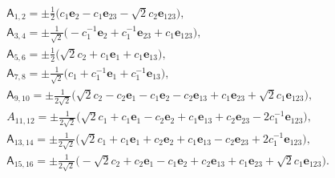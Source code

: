 \documentclass{birkjour}
\newcommand{\e}[1]{\mathbf{e}_{#1}} %
\def\A{\mathsf{A}}
\def\e#1{\mathbf{e}_{#1}} %
\begin{document}
\begin{equation}
\begin{split}
  &\A_{1,2}=\pm\tfrac{1}{2}\big(c_1 \e{2}-c_1 \e{2 3}-\sqrt{2}c_2\e{123}\big),\\
 &\A_{3,4}=\pm\tfrac{1}{\sqrt{2}}\big(-c_1^{-1}\e{2}+c_1^{-1}\e{2 3}+c_1 \e{1 2 3}\big),\\
&\A_{5,6}=\pm\tfrac{1}{2}\big(\sqrt{2}c_2+c_1\e{1}+c_1\e{13}\big),\\
&\A_{7,8}=\pm\tfrac{1}{\sqrt{2}}\big(c_1+ c_1^{-1}\e{1}+c_1^{-1}\e{1 3}\big),\\
&\A_{9,10}=\pm\tfrac{1}{2\sqrt{2}}\big(\sqrt{2}c_2-c_2\e{1}-c_1\e{2}-c_2\e{13}+c_1\e{2 3}+\sqrt{2}c_1 \e{1 2 3}\big),\\
  &A_{11,12}=\pm\tfrac{1}{2\sqrt{2}}\big(\sqrt{2}c_ 1+c_1 \e{1}-c_ 2 \e{2}+c_1 \e{1 3}+c_2 \e{2 3}-2c_1^{-1}\e{1 2 3}\big),\\
&\A_{13,14}=\pm\tfrac{1}{2\sqrt{2}}\big(\sqrt{2}c_1+c_1 \e{1}+c_2 \e{2}+c_1 \e{1 3}-c_2 \e{2 3}+2c_1^{-1}\e{1 2 3}\big),\\
&\A_{15,16}=\pm\tfrac{1}{2\sqrt{2}}\big(-\sqrt{2}c_2+c_2 \e{1}-c_1
\e{2}+c_2 \e{13}+c_1 \e{2 3}+\sqrt{2}c_1 \e{1 2 3}\big) .
\end{split}\end{equation}
\end{document}
